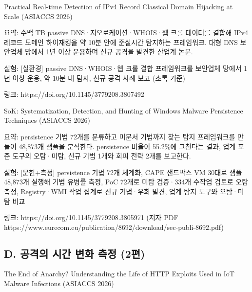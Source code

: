 \par\noindent \textbullet\enspace Practical Real-time Detection of IPv4 Record Classical Domain Hijacking at Scale (ASIACCS 2026)

\par\noindent \textbullet\enspace 요약: 수백 TB passive DNS·지오로케이션·WHOIS·웹 크롤 데이터를 결합해 IPv4 레코드 도메인 하이재킹을 약 10분 안에 준실시간 탐지하는 프레임워크. 대형 DNS 보안업체 망에서 1년 이상 운용하며 신규 공격을 발견한 산업계 논문.


\par\noindent \textbullet\enspace 실험: [실환경] passive DNS·WHOIS·웹 크롤 결합 프레임워크를 보안업체 망에서 1년 이상 운용, 약 10분 내 탐지, 신규 공격 사례 보고 (초록 기준)


\par\noindent \textbullet\enspace 링크: https:/\allowbreak{}/\allowbreak{}doi.org/\allowbreak{}10.1145/\allowbreak{}3779208.3807492



\par\noindent \textbullet\enspace SoK: Systematization, Detection, and Hunting of Windows Malware Persistence Techniques (ASIACCS 2026)

\par\noindent \textbullet\enspace 요약: persistence 기법 72개를 분류하고 미문서 기법까지 찾는 탐지 프레임워크를 만들어 48,873개 샘플을 분석한다. persistence 비율이 55.2\%에 그친다는 결과, 업계 표준 도구의 오탐·미탐, 신규 기법 1개와 회피 전략 2개를 보고한다.


\par\noindent \textbullet\enspace 실험: [문헌+\allowbreak{}측정] persistence 기법 72개 체계화, CAPE 샌드박스 VM 30대로 샘플 48,873개 실행해 기법 유병률 측정, PoC 72개로 미탐 검증·334개 수작업 검토로 오탐 측정, Registry·WMI 작업 집계로 신규 기법·우회 발견, 업계 탐지 도구와 오탐·미탐 비교


\par\noindent \textbullet\enspace 링크: https:/\allowbreak{}/\allowbreak{}doi.org/\allowbreak{}10.1145/\allowbreak{}3779208.3805971 (저자 PDF https:/\allowbreak{}/\allowbreak{}www.eurecom.eu/\allowbreak{}publication/\allowbreak{}8692/\allowbreak{}download/\allowbreak{}sec-publi-8692.pdf)



\subsection{D. 공격의 시간 변화 측정 (2편)}
\par\noindent \textbullet\enspace The End of Anarchy? Understanding the Life of HTTP Exploits Used in IoT Malware Infections (ASIACCS 2026)

